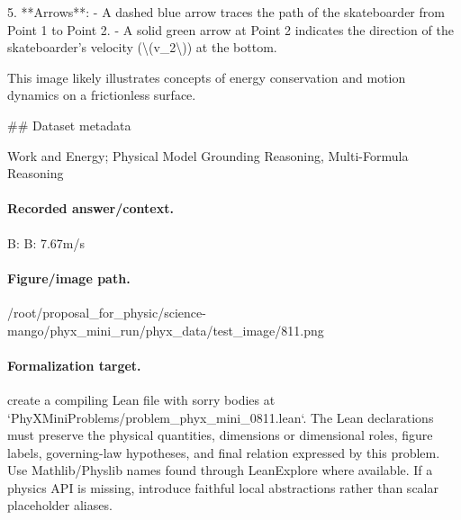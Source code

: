5. **Arrows**:
   - A dashed blue arrow traces the path of the skateboarder from Point 1 to Point 2.
   - A solid green arrow at Point 2 indicates the direction of the skateboarder's velocity (\textbackslash{}(v\_2\textbackslash{})) at the bottom.

This image likely illustrates concepts of energy conservation and motion dynamics on a frictionless surface.

\#\# Dataset metadata

Work and Energy; Physical Model Grounding Reasoning, Multi-Formula Reasoning

\paragraph{Recorded answer/context.}
B: B: 7.67m/s

\paragraph{Figure/image path.}
/root/proposal\_for\_physic/science-mango/phyx\_mini\_run/phyx\_data/test\_image/811.png

\paragraph{Formalization target.}
create a compiling Lean file with sorry bodies at `PhyXMiniProblems/problem\_phyx\_mini\_0811.lean`. The Lean declarations must preserve the physical quantities, dimensions or dimensional roles, figure labels, governing-law hypotheses, and final relation expressed by this problem.
Use Mathlib/Physlib names found through LeanExplore where available. If a physics API is missing, introduce faithful local abstractions rather than scalar placeholder aliases.


